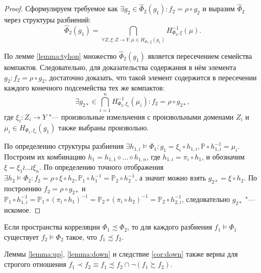 \begin{proof}
	Сформулируем требуемое как $\exists g_2 \in \widehat{\Phi}_2(g_1) : f_2 = \rho \circ g_2$ и выразим $\widehat{\Phi}_2$ через структуры разбиений:
	\begin{equation*}%
		\widehat{\Phi}_2(g_1) = \bigcap_{\forall Z, \xi : Z \rightarrow Y, \mu \in H_{\Phi_1,\xi}(g_1)} H_{\Phi_2,\xi}^{-1}(\mu).
	\end{equation*}
	
	По лемме \ref{lemma:tyhon} множество $\widehat{\Phi}_2(g_1)$ является пересечением семейства компактов. Следовательно, для доказательства содержания в нём элемента $g_2 : f_2 = \rho \circ g_2$, достаточно доказать, что такой элемент содержится в пересечении каждого конечного подсемейства тех же компактов:
	\begin{equation*}%
		\exists g_{2*} \in \bigcap_{i=1}^n H_{\Phi_2,\xi_i}^{-1}(\mu_i) : f_2 = \rho \circ g_{2*},
	\end{equation*}
	где $\xi_i : Z_i \rightarrow Y$ "--- произвольные измельчения с произвольными доменами $Z_i$ и $\mu_i \in H_{\Phi_1,\xi_i}(g_1)$ также выбраны произвольно.
	
	По определению структуры разбиения $\exists h_{1,i} \models \Phi_1 : g_1 = \xi_i \circ h_{1,i}, \mathbb{P} \circ h_{1,i}^{-1} = \mu_i$. Построим их комбинацию $h_1 = h_{1,1} \diamond ... \diamond h_{1,n}$, где $h_{1,i} = \pi_i \circ h_1$, и обозначим $\xi = \xi_1 \wr ... \wr \xi_n$. По определению точного отображения $\exists h_2 \models \Phi_2 : f_2 = \rho \circ \xi \circ h_2, \mathbb{P}_1 \circ h_1^{-1} = \mathbb{P}_2 \circ h_2^{-1}$, а значит можно взять $g_{2*} = \xi \circ h_2$. По построению $f_2 = \rho \circ g_{2*}$ и $\mathbb{P}_1 \circ h_{1,i}^{-1} = \mathbb{P}_1 \circ (\pi_i \circ h_1)^{-1} = \mathbb{P}_2 \circ (\pi_i \circ h_2)^{-1} = \mathbb{P}_2 \circ h_{2,i}^{-1}$, следовательно $g_{2*}$ "--- искомое.
\end{proof}

\begin{corollary} \label{cor:down}
	Если пространства корреляции $\Phi_1 \precsim \Phi_2$, то для каждого разбиения $f_1 \models \Phi_1$ существует $f_2 \models \Phi_2$ такое, что $f_1 \precsim f_2$.
\end{corollary}

\begin{corollary}
	Леммы \ref{lemma:up}, \ref{lemma:down} и следствие \ref{cor:down} также верны для строгого отношения $f_1 \prec f_2 \equiv f_1 \precsim f_2 \cap \neg (f_1 \succsim f_2)$.
\end{corollary}

